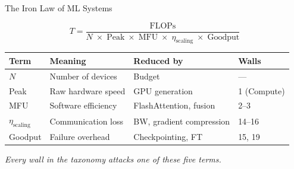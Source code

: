 \documentclass[aspectratio=169, 12pt]{beamer}
\begin{document}
\begin{frame}{The Iron Law of ML Systems}

\[
T = \frac{\text{FLOPs}}{N \;\times\; \text{Peak} \;\times\; \text{MFU}
  \;\times\; \eta_{\text{scaling}} \;\times\; \text{Goodput}}
\]

\vspace{0.3cm}
\small
\begin{tabular}{llll}
\toprule
\textbf{Term} & \textbf{Meaning} & \textbf{Reduced by} & \textbf{Walls} \\
\midrule
$N$ & Number of devices & Budget & --- \\
Peak & Raw hardware speed & GPU generation & 1 (Compute) \\
MFU & Software efficiency & FlashAttention, fusion & 2--3 \\
$\eta_{\text{scaling}}$ & Communication loss & BW, gradient compression & 14--16 \\
Goodput & Failure overhead & Checkpointing, FT & 15, 19 \\
\bottomrule
\end{tabular}

\vspace{0.3cm}
\centering
\textit{Every wall in the taxonomy attacks one of these five terms.}
\end{frame}
\end{document}
